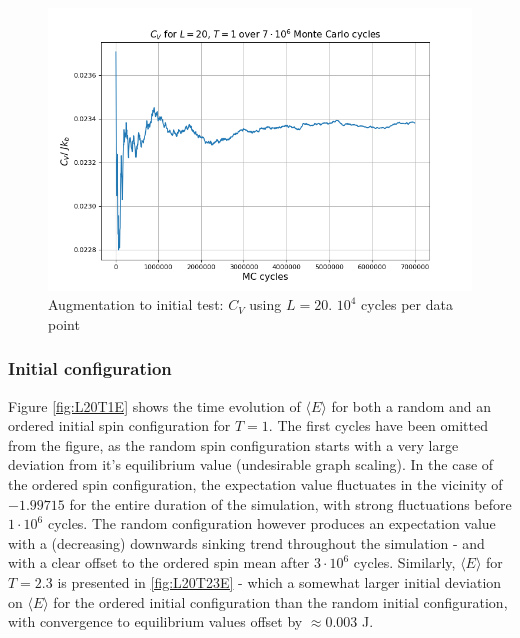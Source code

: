 \documentclass[%
oneside,                 %
final,                   %
10pt]{article}
\begin{document}
\begin{figure}[!htb]
        \centering 
         \includegraphics[scale=.55]{../Results/L20T1_CV.png} 
        \caption{Augmentation to initial test: $C_V$ using $L=20$. $10^4$ cycles per data point}
        \label{fig:L20CV}   
\end{figure} 

\subsubsection*{Initial configuration}
Figure \ref{fig:L20T1E} shows the time evolution of $\langle E \rangle$ for both a random and an ordered initial spin configuration for $T=1$. The first cycles have been omitted from the figure, as the random spin configuration starts with a very large deviation from it's equilibrium value (undesirable graph scaling). In the case of the ordered spin configuration, the expectation value fluctuates in the vicinity of $-1.99715$ for the entire duration of the simulation, with strong fluctuations before $1 \cdot 10^6$ cycles. The random configuration however produces an expectation value with a (decreasing) downwards sinking trend throughout the simulation - and with a clear offset to the ordered spin mean after $3 \cdot 10^6$ cycles. Similarly, $\langle E \rangle$ for $T=2.3$ is presented in  \ref{fig:L20T23E} - which a somewhat larger initial deviation on $\langle E \rangle$ for the ordered initial configuration than the random initial configuration, with convergence to equilibrium values offset by $\approx 0.003$ J.   \newline
\end{document}
